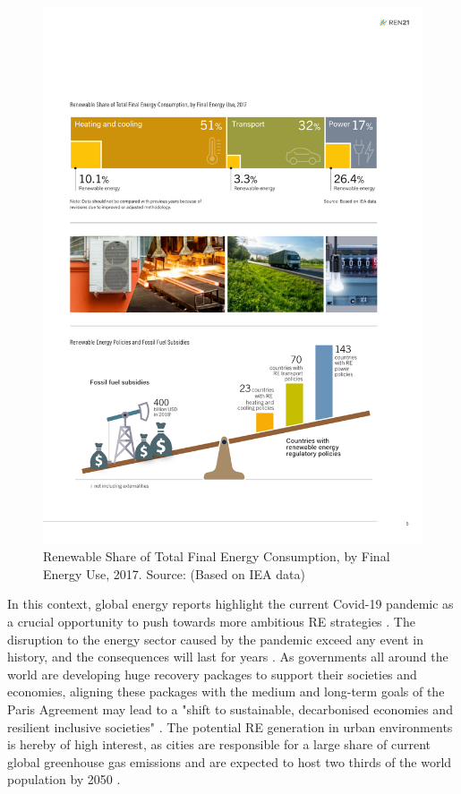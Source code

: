 \begin{figure}
\centering 
\includegraphics[width=\textwidth]{images/gsr_2020_RE_share.pdf} 
\caption[Renewable Share of Total Final Energy Consumption, by Final Energy Use, 2017]{Renewable Share of Total Final Energy Consumption, by Final Energy Use, 2017. Source: \citet{ren21_renewables_2020} (Based on IEA data)}
\label{fig:ren21_RE_use} 
\end{figure}

In this context, global energy reports highlight the current Covid-19 pandemic as a crucial opportunity to push towards more ambitious RE strategies \cite{iea_world_2020,irena_global_2020,fs-unep_global_2020}. 
The disruption to the energy sector caused by the pandemic exceed any event in history, and the consequences will last for years \cite{iea_world_2020}. 
As governments all around the world are developing huge recovery packages to support their societies and economies, aligning these packages with the medium and long-term goals of the Paris Agreement may lead to a "shift to sustainable, decarbonised economies and resilient inclusive societies" \cite{irena_global_2020}. 
The potential RE generation in urban environments is hereby of high interest, as cities are responsible for a large share of current global greenhouse gas emissions and are expected to host two thirds of the world population by 2050 \cite{irena_rise_2020}. 

